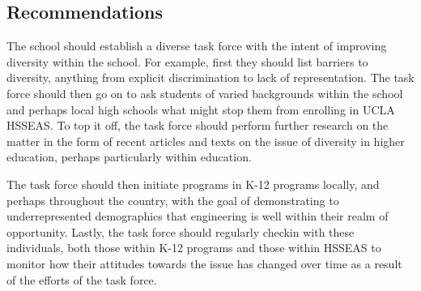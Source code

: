 \documentclass[]{article}
\begin{document}
\subsection{Recommendations}
The school should establish a diverse task force with the intent of improving diversity within the school. For example, first they should list barriers to diversity, anything from explicit discrimination to lack of representation. The task force should then go on to ask students of varied backgrounds within the school and perhaps local high schools what might stop them from enrolling in UCLA HSSEAS. To top it off, the task force should perform further research on the matter in the form of recent articles and texts on the issue of diversity in higher education, perhaps particularly within education.

The task force should then initiate programs in K-12 programs locally, and perhaps throughout the country, with the goal of demonstrating to underrepresented demographics that engineering is well within their realm of opportunity. Lastly, the task force should regularly checkin with these individuals, both those within K-12 programs and those within HSSEAS to monitor how their attitudes towards the issue has changed over time as a result of the efforts of the task force. 
\end{document}

